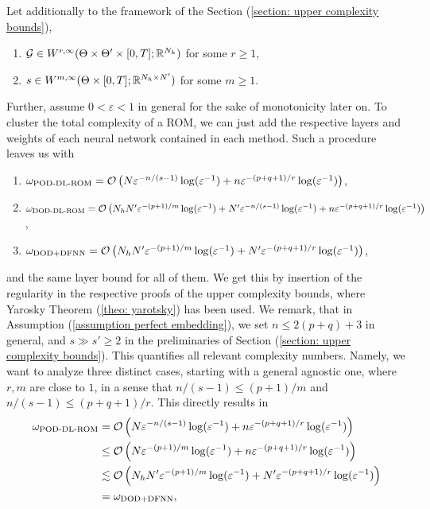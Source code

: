 Let additionally to the framework of the Section (\ref{section: upper complexity bounds}),
\begin{enumerate}
    \item $\mathcal{G} \in W^{r, \infty}(\Theta \times \Theta' \times [0, T]; \mathbb{R}^{N_h})$ for some $r \geq 1$,
    \item $s \in W^{m, \infty}(\Theta \times [0, T]; \mathbb{R}^{N_h \times N'})$ for some $m \geq 1$.
\end{enumerate}
Further, assume $0 < \varepsilon < 1$ in general for the sake of monotonicity later on.
To cluster the total complexity of a ROM, we can just add the respective layers and weights of each
neural network contained in each method. Such a procedure leaves us with
\begin{enumerate}
    \item[-] $\omega_\text{POD-DL-ROM} = \mathcal{O}\left( N \varepsilon^{-n/(s-1)} \log(\varepsilon^{-1}) + 
    n \varepsilon^{-(p+q+1)/r} \log(\varepsilon^{-1})\right)$,
    \item[-] $\omega_\text{DOD-DL-ROM} = \mathcal{O}\left( N_h N' \varepsilon^{-(p+1)/m} \log(\varepsilon^{-1})
    + N' \varepsilon^{-n/(s-1)} \log(\varepsilon^{-1}) + 
    n \varepsilon^{-(p+q+1)/r} \log(\varepsilon^{-1})\right)$,
    \item[-] $\omega_\text{DOD+DFNN} = \mathcal{O}\left( N_h N' \varepsilon^{-(p+1)/m} \log(\varepsilon^{-1})
    + N' \varepsilon^{-(p+q+1)/r} \log(\varepsilon^{-1})\right)$,
\end{enumerate}
and the same layer bound for all of them. We get this by insertion of the regularity
in the respective proofs of the upper complexity bounds, where Yarosky Theorem
(\ref{theo: yarotsky}) has been used. We remark, that in Assumption (\ref{assumption perfect embedding}),
we set $n \leq 2(p + q) + 3$ in general, and $s \gg s' \geq 2$ in the preliminaries of 
Section (\ref{section: upper complexity bounds}). This quantifies all relevant complexity numbers.
Namely, we want to analyze three distinct cases, starting with a general agnostic one, where
$r, m$ are close to $1$, in a sense that $n/(s-1) \leq (p+1)/m$ and $n/(s-1) \leq (p+q+1)/r$. 
This directly results in 
\begin{align*}
    \omega_\text{POD-DL-ROM} &= \mathcal{O}\left( N \varepsilon^{-n/(s-1)} \log(\varepsilon^{-1}) + 
    n \varepsilon^{-(p+q+1)/r} \log(\varepsilon^{-1})\right) \\
    &\leq \mathcal{O}\left( N \varepsilon^{-(p+1)/m} \log(\varepsilon^{-1}) +
    n \varepsilon^{-(p+q+1)/r} \log(\varepsilon^{-1})\right) \\
    &\lesssim \mathcal{O}\left( N_h N' \varepsilon^{-(p+1)/m} \log(\varepsilon^{-1}) + 
    N' \varepsilon^{-(p+q+1)/r} \log(\varepsilon^{-1}) \right) \\
    &= \omega_\text{DOD+DFNN},
\end{align*}
